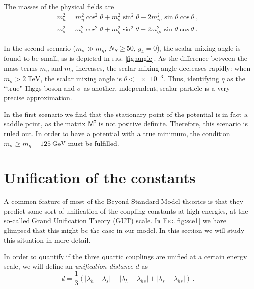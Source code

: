 \documentclass[aps,prd,preprintnumbers,nofootinbibn,twocolumn]{revtex4}
\begin{document}
The masses of the physical fields are
\begin{align}
m_h^2 = m_\eta^2 \cos^2 \theta + m_\sigma^2 \sin^2 \theta - 2 m_{\eta\sigma}^2 \sin \theta \cos \theta\ , \\
m_s^2 = m_\sigma^2 \cos^2 \theta + m_\eta^2 \sin^2 \theta + 2 m_{\eta\sigma}^2 \sin \theta \cos \theta\ .
\end{align}

In the second scenario ($m_\sigma \gg m_\eta$, $N_S \geq 50$, $g_4=0$), the scalar mixing angle is found to be small, as is depicted in \textsc{fig.} \ref{fig:angle}. As the difference between the mass terms $m_\eta$ and $m_\sigma$ increases, the scalar mixing angle decreases rapidly: when $m_\sigma > \SI{2}{\tera\electronvolt}$, the scalar mixing angle is $\theta < \num{e-3}$. Thus, identifying $\eta$ as the ``true'' Higgs boson and $\sigma$ as another, independent, scalar particle is a very precise approximation.

In the first scenario we find that the stationary point of the potential is in fact a saddle point, as the matrix $\mathsf{M}^2$ is not positive definite. Therefore, this scenario is ruled out. In order to have a potential with a true minimum, the condition $m_\sigma \geq m_\eta = \SI{125}{\giga\electronvolt}$ must be fulfilled.


\section{Unification of the constants}\label{sec:GUT}

A common feature of most of the Beyond Standard Model theories is that they predict some sort of unification of the coupling constants at high energies, at the so-called Grand Unification Theory (GUT) scale. In \textsc{Fig.}\ref{fig:sce1} we have glimpsed that this might be the case in our model. In this section we will study this situation in more detail.

In order to quantify if the three quartic couplings are unified at a certain energy scale, we will define an \textit{unification distance} $d$ as
\begin{equation}
d = \frac{1}{3}(|\lambda_h - \lambda_s| + |\lambda_h - \lambda_{hs}|+ |\lambda_s - \lambda_{hs}|)\ .
\end{equation}
\end{document}

